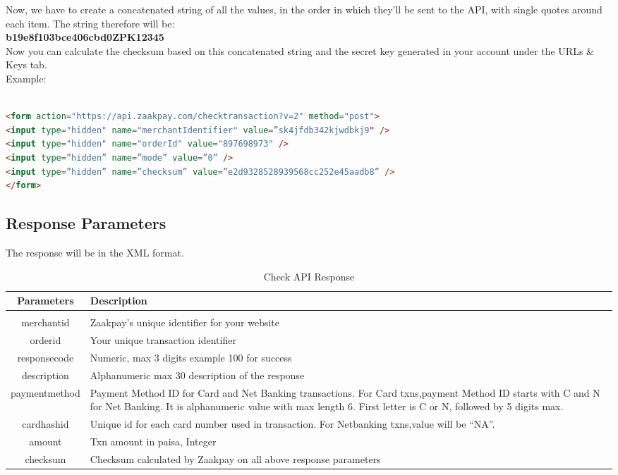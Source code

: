 \documentclass{article}
\begin{document}
Now, we have to create a concatenated string of all the values, in the order in which they'll be sent to the API, with single quotes around each item. The string therefore will be: \\
{\bfseries \textquotesingle{}b19e8f103bce406cbd\textquotesingle{}\textquotesingle{}0\textquotesingle{}\textquotesingle{}ZPK12345\textquotesingle{}} \\
Now you can calculate the checksum based on this concatenated string and the secret key
generated in your account under the URLs \& Keys tab.\\
Example: \\
\begin{lstlisting}[language=html,breaklines=true]

<form action="https://api.zaakpay.com/checktransaction?v=2" method="post">
<input type="hidden" name="merchantIdentifier" value=”sk4jfdb342kjwdbkj9" />
<input type="hidden" name="orderId" value="897698973" />
<input type=”hidden” name=”mode” value=”0” />
<input type=”hidden” name=”checksum” value=”e2d9328528939568cc252e45aadb8” />
</form>
\end{lstlisting}

\subsection{Response Parameters}
The response will be in the XML format.
\begin{longtable}{||c|p{12.5cm}||}
     \caption{Check API Response}\\
 \rowcolor{green!50}
\bfseries{Parameters} & \bfseries{Description} \\ \hline
 & \\
merchantid & Zaakpay's unique identifier for your website \\
orderid & Your unique transaction identifier\\
responsecode &Numeric, max 3 digits example 100 for success \\
description &Alphanumeric max 30 description of the response \\
paymentmethod & Payment Method ID for Card and Net Banking transactions. For Card txns,payment Method ID starts with C and N for Net Banking. It is alphanumeric value with max length 6. First letter is C or N, followed by 5
digits max. \\
cardhashid &Unique id for each card number used in transaction. For Netbanking txns,value will be “NA”. \\
amount &Txn amount in paisa, Integer \\
checksum &Checksum calculated by Zaakpay on all above response parameters \\



\end{longtable}
\end{document}
